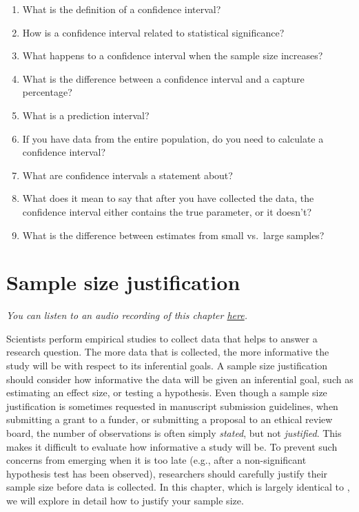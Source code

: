 \documentclass[
  oneside]{book}
\begin{document}
\begin{enumerate}
\def\labelenumi{\arabic{enumi}.}
\item
  What is the definition of a confidence interval?
\item
  How is a confidence interval related to statistical significance?
\item
  What happens to a confidence interval when the sample size increases?
\item
  What is the difference between a confidence interval and a capture percentage?
\item
  What is a prediction interval?
\item
  If you have data from the entire population, do you need to calculate a confidence interval?
\item
  What are confidence intervals a statement about?
\item
  What does it mean to say that after you have collected the data, the confidence interval either contains the true parameter, or it doesn't?
\item
  What is the difference between estimates from small vs.~large samples?
\end{enumerate}

\hypertarget{power}{%
\chapter{Sample size justification}\label{power}}

\emph{You can listen to an audio recording of this chapter \href{https://soundcloud.com/lakens/sample-size-justification-by-daniel-lakens}{here}.}

Scientists perform empirical studies to collect data that helps to answer a research question. The more data that is collected, the more informative the study will be with respect to its inferential goals. A sample size justification should consider how informative the data will be given an inferential goal, such as estimating an effect size, or testing a hypothesis. Even though a sample size justification is sometimes requested in manuscript submission guidelines, when submitting a grant to a funder, or submitting a proposal to an ethical review board, the number of observations is often simply \emph{stated}, but not \emph{justified}. This makes it difficult to evaluate how informative a study will be. To prevent such concerns from emerging when it is too late (e.g., after a non-significant hypothesis test has been observed), researchers should carefully justify their sample size before data is collected. In this chapter, which is largely identical to \citet{lakens_sample_2022}, we will explore in detail how to justify your sample size.
\end{document}
